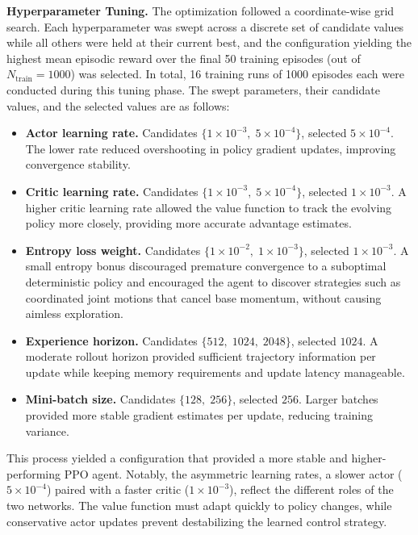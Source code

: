 \documentclass{ieeeaccess}
\begin{document}
\textbf{Hyperparameter Tuning.} The optimization followed a coordinate-wise grid search. Each hyperparameter was swept across
a discrete set of candidate values while all others were held at their current
best, and the configuration yielding the highest mean episodic reward over the final 50
training episodes (out of $N_{\text{train}}=1000$) was selected. In total, 16 training runs of 1000
episodes each were conducted during this tuning phase. The swept parameters, their candidate values,
and the selected values are as follows:
\begin{itemize}
  \item \textbf{Actor learning rate.} Candidates $\{1\!\times\!10^{-3},\;5\!\times\!10^{-4}\}$, selected $5\!\times\!10^{-4}$. The lower rate reduced overshooting in
  policy gradient updates, improving convergence stability.
  \item \textbf{Critic learning rate.} Candidates $\{1\!\times\!10^{-3},\;5\!\times\!10^{-4}\}$, selected $1\!\times\!10^{-3}$. A higher critic learning rate allowed
  the value function to track the evolving policy more closely, providing more accurate advantage
  estimates.
  \item \textbf{Entropy loss weight.} Candidates $\{1\!\times\!10^{-2},\;1\!\times\!10^{-3}\}$, selected $1\!\times\!10^{-3}$. A small entropy bonus discouraged premature
  convergence to a suboptimal deterministic policy and encouraged the agent to discover strategies such
  as coordinated joint motions that cancel base momentum, without causing aimless exploration.
  \item \textbf{Experience horizon.} Candidates $\{512,\;1024,\;2048\}$, selected $1024$. A moderate rollout horizon provided sufficient trajectory
  information per update while keeping memory requirements and update latency manageable.
  \item \textbf{Mini-batch size.} Candidates $\{128,\;256\}$, selected $256$. Larger batches provided more stable gradient estimates
  per update, reducing training variance.
\end{itemize}

This process yielded a configuration that provided a more stable and higher-performing PPO agent.
Notably, the asymmetric learning rates, a slower actor ($5\!\times\!10^{-4}$) paired with a faster critic
($1\!\times\!10^{-3}$), reflect the different roles of the two networks. The value function must adapt
quickly to policy changes, while conservative actor updates prevent destabilizing the learned control strategy.
\end{document}
